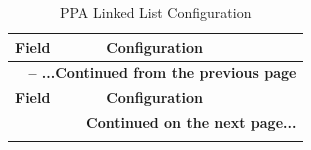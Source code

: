 \documentclass[main\_\_EN.tex]{subfiles}
\begin{document}
\begin{longtable}[c]{ |p{2.5cm}|p{8cm}| }
    \caption{PPA Linked List Configuration}
    \label{tab:ppa_link_list_config}\\\hline

    \rowcolor{lightgray}
    \textbf{Field} & \textbf{Configuration} \\\hline
    \endfirsthead


    \multicolumn{2}{c}{\bfseries \tablename\ \thetable{} -- ...Continued from the previous page}\\\hline
    \rowcolor{lightgray}
    \textbf{Field} & \textbf{Configuration} \\\hline
    \endhead

    \multicolumn{2}{r}{\textbf{Continued on the next page...}} \\
    \endfoot

    \endlastfoot


\end{longtable}
\end{document}
